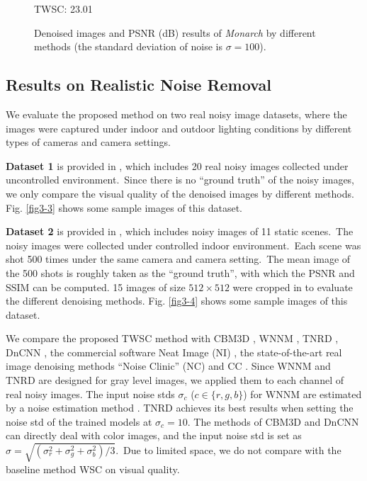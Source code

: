 \begin{figure}[t!]
{\begin{minipage}[t]{0.19\textwidth}
{\footnotesize TWSC: 23.01}
\end{minipage}
}\vspace{-3mm}
\caption{Denoised images and PSNR (dB) results of \textsl{Monarch} by different methods (the standard deviation of noise is $\sigma=100$).}
    \label{fig5-6}
\end{figure}




\subsection{Results on Realistic Noise Removal}


We evaluate the proposed method on two real noisy image datasets, where the images were captured under indoor and outdoor lighting conditions by different types of cameras and camera settings. 

\textbf{Dataset 1} is provided in \cite{ncwebsite}, which includes 20 real noisy images collected under uncontrolled environment.\ Since there is no ``ground truth'' of the noisy images, we only compare the visual quality of the denoised images by different methods. Fig. \ref{fig3-3} shows some sample images of this dataset.

\textbf{Dataset 2} is provided in \cite{crosschannel2016}, which includes noisy images of 11 static scenes.\ The noisy images were collected under controlled indoor environment.\ Each scene was shot 500 times under the same camera and camera setting.\ The mean image of the 500 shots is roughly taken as the ``ground truth'', with which the PSNR and SSIM \cite{ssim} can be computed. 15 images of size $512\times512$ were cropped in \cite{crosschannel2016} to evaluate the different denoising methods. Fig. \ref{fig3-4} shows some sample images of this dataset.

We compare the proposed TWSC method with CBM3D \cite{cbm3d}, WNNM \cite{wnnm}, TNRD \cite{tnrd}, DnCNN \cite{dncnn}, the commercial software Neat Image (NI) \cite{neatimage}, the state-of-the-art real image denoising methods ``Noise Clinic'' (NC) \cite{noiseclinic} and CC \cite{crosschannel2016}. Since WNNM and TNRD are designed for gray level images, we applied them to each channel of real noisy images. The input noise stds $\sigma_{c}$ ($c\in\{r,g,b\}$) for WNNM are estimated by a noise estimation method \cite{Chen2015ICCV}. TNRD achieves its best results when setting the noise std of the trained models at $\sigma_{c}=10$. The methods of CBM3D and DnCNN can directly deal with color images, and the input noise std is set as $\sigma=\sqrt{(\sigma_{r}^{2}+\sigma_{g}^{2}+\sigma_{b}^{2})/3}$.\ Due to limited space, we do not compare with the baseline method WSC on visual quality.

